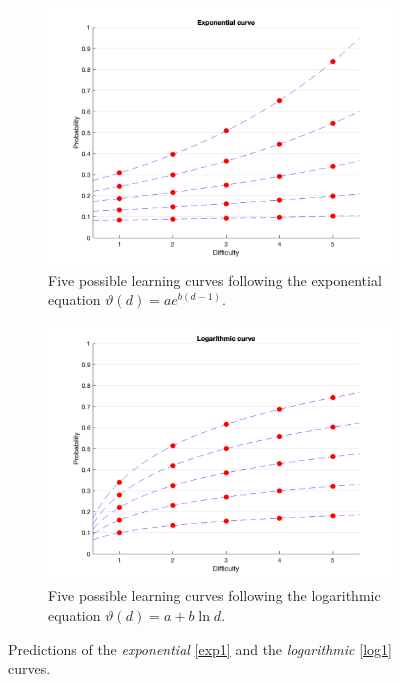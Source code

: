 \documentclass{article}
\newcommand{\0}{\mathbbold{0}}
\newcommand{\1}{\mathds{1}}
\begin{document}
\begin{figure}[ht!]
    \centering
    \begin{subfigure}[b]{0.4\linewidth}
        \includegraphics[width=\linewidth]{exp.png}
        \caption{Five possible learning curves following the exponential equation $\vartheta(d) = ae^{b(d-1)}$.}
        \label{exp1}
    \end{subfigure}\hspace{0.05\linewidth}
    \begin{subfigure}[b]{0.4\linewidth}
        \includegraphics[width=\linewidth]{log.png}
        \caption{Five possible learning curves following the logarithmic equation $\vartheta(d) = a + b\ln d$.}
        \label{log1}
    \end{subfigure}
    \caption{Predictions of the \textsl{exponential} \eqref{exp1} and the \textsl{logarithmic} \eqref{log1} curves.}
    \label{fig1}
\end{figure}
\end{document}
